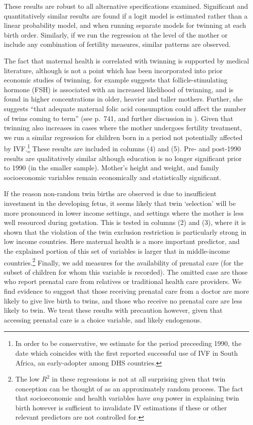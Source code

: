 These results are robust to all alternative specifications examined. Significant
and quantitatively similar results are found if a logit model is estimated 
rather than a linear probability model, and when running separate models for 
twinning at each birth order.  Similarly, if we run the regression at the level
of the mother or include any combination of fertility measures, similar 
patterns are observed.

The fact that maternal health is correlated with twinning is supported by 
medical literature, although is not a point which has been incorporated into 
prior economic studies of twinning.  \citet{Hall2003} for example suggests that 
follicle-stimulating hormone (FSH) is associated with an increased likelihood 
of twinning, and is found in higher concentrations in older, heavier and taller 
mothers.  Further, she suggests ``that adequate maternal folic acid consumption 
could affect the number of twins coming to term'' (see p.\ 741, and further 
discussion in \citet{Lietal2003}).  Given that twinning also increases in cases 
where the mother undergoes fertility treatment, we run a similar regression for 
children born in a period not potentially affected by IVF.\footnote{In order to 
be conservative, we estimate for the period preceeding 1990, the date which 
coincides with the first reported successful use of IVF in South Africa, an 
early-adopter among DHS countries.}  These results are included in columns (4) 
and (5).  Pre- and post-1990 results are qualitatively similar although education 
is no longer significant prior to 1990 (in the smaller sample). Mother's height 
and weight, and family socioeconomic variables remain economically and 
statistically significant.

If the reason non-random twin births are observed is due to insufficient investment 
in the developing fetus, it seems likely that twin `selection' will be more 
pronounced in lower income settings, and settings where the mother is less well 
resourced during gestation.  This is tested in columns (2) and (3), where it is 
shown that the violation of the twin exclusion restriction is particularly strong 
in low income countries.  Here maternal health is a more important predictor, and 
the explained portion of this set of variables is larger that in middle-income 
countries.\footnote{The low $R^2$ in these regressions is not at all surprising 
given that twin conception can be thought of as an approximately random process.
The fact that socioeconomic and health variables have \emph{any} power in 
explaining twin birth however is sufficient to invalidate IV estimations if these 
or other relevant predictors are not controlled for.} Finally, we add measures for 
the availability of prenatal care (for the subset of children for whom this variable 
is recorded).  The omitted case are those who report prenatal care from relatives
or traditional health care providers.  We find evidence to suggest that those 
receiving prenatal care from a doctor are more likely to give live birth to twins,
and those who receive no prenatal care are less likely to twin.  We treat these
results with precaution however, given that accessing prenatal care is a choice
variable, and likely endogenous.

